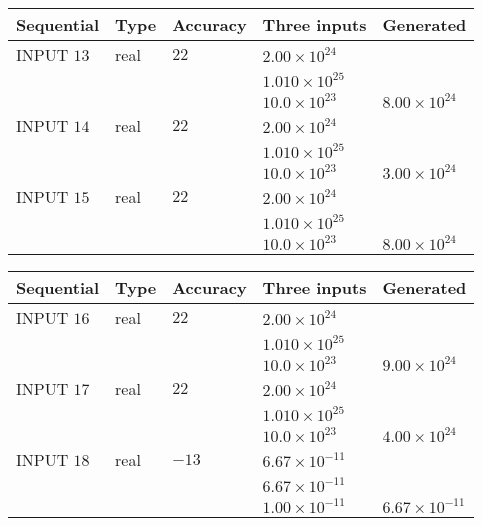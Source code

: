 \documentclass[12pt]{article}
\begin{document}
   
  
  
\noindent\begin{tabular}{|l|l|l|l|l|}
\hline
 Sequential & Type & Accuracy & Three inputs & Generated \\ 
\hline
 
 
  INPUT $          13$ & real & $          22 $ & $
 2.00 \times 10^{24}
  $ & \\
  & & &  $
 1.010 \times 10^{25}
  $ & \\
  & & &  $
 10.0 \times 10^{23}
 $ & $ 8.00 \times 10^{24} $ 
 \\  \hline  
 
 
  INPUT $          14$ & real & $          22 $ & $
 2.00 \times 10^{24}
  $ & \\
  & & &  $
 1.010 \times 10^{25}
  $ & \\
  & & &  $
 10.0 \times 10^{23}
 $ & $ 3.00 \times 10^{24} $ 
 \\  \hline  
 
 
  INPUT $          15$ & real & $          22 $ & $
 2.00 \times 10^{24}
  $ & \\
  & & &  $
 1.010 \times 10^{25}
  $ & \\
  & & &  $
 10.0 \times 10^{23}
 $ & $ 8.00 \times 10^{24} $ 
 \\  \hline  
 \end{tabular}
   
   
  
  
\noindent\begin{tabular}{|l|l|l|l|l|}
\hline
 Sequential & Type & Accuracy & Three inputs & Generated \\ 
\hline
 
 
  INPUT $          16$ & real & $          22 $ & $
 2.00 \times 10^{24}
  $ & \\
  & & &  $
 1.010 \times 10^{25}
  $ & \\
  & & &  $
 10.0 \times 10^{23}
 $ & $ 9.00 \times 10^{24} $ 
 \\  \hline  
 
 
  INPUT $          17$ & real & $          22 $ & $
 2.00 \times 10^{24}
  $ & \\
  & & &  $
 1.010 \times 10^{25}
  $ & \\
  & & &  $
 10.0 \times 10^{23}
 $ & $ 4.00 \times 10^{24} $ 
 \\  \hline  
 
 
  INPUT $          18$ & real & $         -13 $ & $
 6.67 \times 10^{-11}
  $ & \\
  & & &  $
 6.67 \times 10^{-11}
  $ & \\
  & & &  $
 1.00 \times 10^{-11}
 $ & $ 6.67 \times 10^{-11} $ 
 \\  \hline  
 \end{tabular}
   
\end{document}
